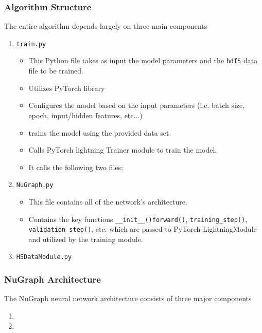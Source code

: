 \documentclass{beamer}
\begin{document}
\begin{frame}
	\frametitle{Algorithm Structure}
		The entire algorithm depends largely on three main components
		\begin{enumerate} 
			\item \texttt{train.py}
				\begin{itemize}
					\item This Python file takes as input the model parameters and the \texttt{hdf5} data file to be trained. 
					\item Utilizes PyTorch library
					\item Configures the model based on the input parameters (i.e. batch size, epoch, input/hidden features, etc...)
					\item trains the model using the provided data set.
					\item Calls PyTorch lightning Trainer module to train the model.
					\item It calls the following two files;
				\end{itemize}

			\item \texttt{NuGraph.py}
				\begin{itemize}
					\item This file contains all of the network's architecture.
					\item Contains the key functions \texttt{\_\_init\_\_()}\texttt{forward()}, \texttt{training\_step()}, \texttt{validation\_step()}, etc. which are passed to PyTorch LightningModule and utilized by the training module.
				\end{itemize}

			\item \texttt{H5DataModule.py}
		\end{enumerate}
\end{frame}


\begin{frame}
	\frametitle{NuGraph Architecture}
		The NuGraph neural network architecture consists of three major components
		\begin{enumerate} 
			\item 

			\item 
		\end{enumerate}
\end{frame}
\end{document}
